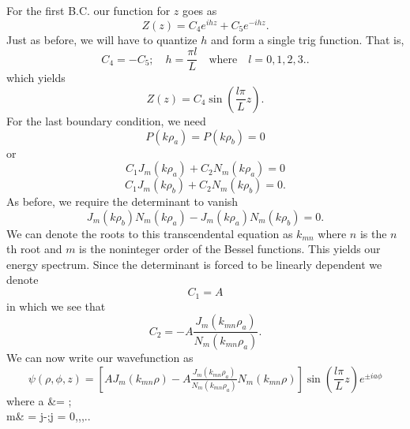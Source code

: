 \documentclass[11pt,letterpaper]{article}
\begin{document}
		For the first B.C. our function for $z$ goes as
                \[
                		Z(z) = C_4e^{ihz}+C_5e^{-ihz}.
		\]
                Just as before, we will have to quantize $h$ and form a single trig function. That is,
                \[
                		C_4 = -C_5;\quad h = \frac{\pi l}{L}\quad\text{where}\quad l=0,1,2,3..
		\]
                which yields 
                \[
                		Z(z) = C_4\sin\left(\frac{l\pi}{L}z\right).
		\]
                For the last boundary condition, we need
                \[
                		P(k\rho_a) = P(k\rho_b) = 0
		\]
                or
                \[
                		C_1J_m(k\rho_a)+C_2N_m(k\rho_a) = 0
		\]
                \[
                		C_1J_m(k\rho_b)+C_2N_m(k\rho_b) = 0.
		\]
		As before, we require the determinant to vanish
		\[
                		J_m(k\rho_b)N_m(k\rho_a)-J_m(k\rho_a)N_m(k\rho_b) = 0.
		\]
		We can denote the roots to this transcendental equation as $k_{mn}$ where $n$ is the $n$th root and $m$ is the noninteger order 
		of the Bessel functions. This yields our energy spectrum. Since the determinant is forced to be linearly dependent we denote
                \[
                		C_1 = A
		\]
                in which we see that
                \[
                		C_2 = -A\frac{J_m(k_{mn}\rho_a)}{N_m(k_{mn}\rho_a)}.
		\]
		We can now write our wavefunction as 
		\[
                		\psi(\rho,\phi,z) = \left[AJ_m(k_{mn}\rho)-A\tfrac{J_m(k_{mn}\rho_a)}{N_m(k_{mn}\rho_a)}N_m(k_{mn}\rho)\right]\sin\left(\frac{l	
			\pi}{L}z\right)e^{\pm ia\phi}
		\]
		where 		
		\ba
			a &= \frac{\alpha}{\h}\pm{};\quad \alpha \equiv {}\\
			m& = j-;\quad{}\quad j = 0,,,..
		\ea
		
\end{document}
